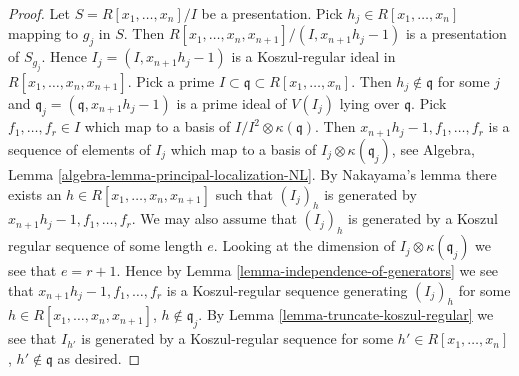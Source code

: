 \documentclass[10pt,a4paper]{amsart}
\theoremstyle{plain}
\theoremstyle{definition}
\theoremstyle{remark}
\numberwithin{equation}{subsection}
\begin{document}
\begin{proof}
Let $S = R[x_1, \ldots, x_n]/I$ be a presentation. Pick
$h_j \in R[x_1, \ldots, x_n]$ mapping to $g_j$ in $S$.
Then $R[x_1, \ldots, x_n, x_{n + 1}]/(I, x_{n + 1}h_j - 1)$
is a presentation of $S_{g_j}$. Hence
$I_j = (I, x_{n + 1}h_j - 1)$ is a Koszul-regular ideal in
$R[x_1, \ldots, x_n, x_{n + 1}]$. Pick a prime
$I \subset \mathfrak q \subset R[x_1, \ldots, x_n]$.
Then $h_j \not \in \mathfrak q$ for some $j$ and
$\mathfrak q_j = (\mathfrak q, x_{n + 1}h_j - 1)$ is a prime
ideal of $V(I_j)$ lying over $\mathfrak q$.
Pick $f_1, \ldots, f_r \in I$ which map to a basis of
$I/I^2 \otimes \kappa(\mathfrak q)$. Then
$x_{n + 1}h_j - 1, f_1, \ldots, f_r$ is a sequence of elements of $I_j$
which map to a basis of $I_j \otimes \kappa(\mathfrak q_j)$, see
Algebra, Lemma \ref{algebra-lemma-principal-localization-NL}.
By Nakayama's lemma there exists an $h \in R[x_1, \ldots, x_n, x_{n + 1}]$
such that $(I_j)_h$ is generated by $x_{n + 1}h_j - 1, f_1, \ldots, f_r$.
We may also assume that $(I_j)_h$ is generated by a Koszul regular
sequence of some length $e$. Looking at the dimension of
$I_j \otimes \kappa(\mathfrak q_j)$ we see that $e = r + 1$.
Hence by
Lemma \ref{lemma-independence-of-generators}
we see that $x_{n + 1}h_j - 1, f_1, \ldots, f_r$ is a
Koszul-regular sequence generating $(I_j)_h$ for some
$h \in R[x_1, \ldots, x_n, x_{n + 1}]$, $h \not \in \mathfrak q_j$. By
Lemma \ref{lemma-truncate-koszul-regular}
we see that $I_{h'}$ is generated by a Koszul-regular sequence for some
$h' \in R[x_1, \ldots, x_n]$, $h' \not \in \mathfrak q$ as desired.
\end{proof}
\end{document}
